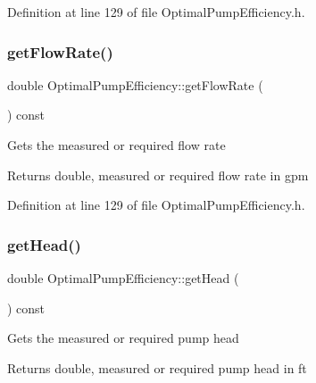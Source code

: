 Definition at line 129 of file Optimal\+Pump\+Efficiency.\+h.

\mbox{\label{class_optimal_pump_efficiency_a77c6618681b0fd3a0fc02dc49d16ee99}} 
\subsubsection{\texorpdfstring{get\+Flow\+Rate()}{getFlowRate()}\hspace{0.1cm}{\footnotesize\ttfamily [3/3]}}
{\footnotesize\ttfamily double Optimal\+Pump\+Efficiency\+::get\+Flow\+Rate (\begin{DoxyParamCaption}{ }\end{DoxyParamCaption}) const\hspace{0.3cm}{\ttfamily [inline]}}

Gets the measured or required flow rate \begin{DoxyReturn}{Returns}
double, measured or required flow rate in gpm 
\end{DoxyReturn}


Definition at line 129 of file Optimal\+Pump\+Efficiency.\+h.

\mbox{\label{class_optimal_pump_efficiency_af31fdb10aabc197ff7536c9bbe006573}} 
\subsubsection{\texorpdfstring{get\+Head()}{getHead()}\hspace{0.1cm}{\footnotesize\ttfamily [1/3]}}
{\footnotesize\ttfamily double Optimal\+Pump\+Efficiency\+::get\+Head (\begin{DoxyParamCaption}{ }\end{DoxyParamCaption}) const\hspace{0.3cm}{\ttfamily [inline]}}

Gets the measured or required pump head \begin{DoxyReturn}{Returns}
double, measured or required pump head in ft 
\end{DoxyReturn}


